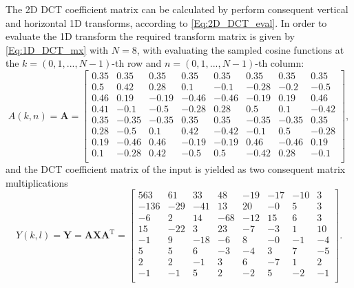 The 2D DCT coefficient matrix can be calculated by perform consequent vertical and horizontal 1D transforms, according to \eqref{Eq:2D_DCT_eval}.
In order to evaluate the 1D transform the required transform matrix is given by \eqref{Eq:1D_DCT_mx} with $N = 8$, with evaluating the sampled cosine functions at the $k = (0,1,...,N-1)$-th row and  $n = (0,1,...,N-1)$-th column:
\begin{equation}
A(k,n) = \mathbf{A} = \begin{bmatrix}
       0.35  &  0.35  &  0.35  &  0.35  &  0.35  &  0.35  &  0.35 & 0.35  \\[0.3em]
	0.5     & 0.42  & 0.28   &  0.1   & -0.1   & -0.28  & -0.2  &  -0.5 \\[0.3em]
    0.46 &  0.19  & -0.19 & -0.46 &  -0.46 & -0.19  &  0.19  &  0.46 \\[0.3em]
    0.41  & -0.1   & -0.5  & -0.28 &   0.28 &  0.5  &   0.1  & -0.42 \\[0.3em]
    0.35  & -0.35  & -0.35 &   0.35 &   0.35  & -0.35 &  -0.35  &  0.35 \\[0.3em]
    0.28  & -0.5 &  0.1 &   0.42 &  -0.42 & -0.1 &   0.5 & -0.28 \\[0.3em]
    0.19  & -0.46  &  0.46  & -0.19 &  -0.19  &  0.46  & -0.46  &  0.19 \\[0.3em]
    0.1 &  -0.28 &    0.42 &  -0.5 & 0.5 & -0.42 & 0.28 & -0.1 \\[0.3em]
       \end{bmatrix}, 
\end{equation}
and the DCT coefficient matrix of the input is yielded as two consequent matrix multiplications
\begin{equation}
Y(k,l) =  \mathbf{Y} = \mathbf{A} \mathbf{X} \mathbf{A}^{\mathrm{T}} =
\begin{bmatrix}
  563  & 61 &  33 &  48 & -19 & -17&  -10 &   3 \\[0.3em]
 -136 & -29 & -41 &  13&  20 & -0 &  5    &   3 \\[0.3em]
   -6 &   2 &  14 & -68 & -12 & 15 &   6  &   3 \\[0.3em]
   15 & -22 &  3  &  23 &  -7 &  -3 &   1 &   10 \\[0.3em]
   -1 &   9& -18  &  -6 &   8 &  -0 &  -1 &  -4 \\[0.3em]
    5 &   5&   6  &  -3 &  -4 &   3 &   7 &  -5 \\[0.3em]
    2 &   2&  -1   &   3 &   6 &  -7 &  1 &   2 \\[0.3em]
   -1&  -1&   5   &   2 &  -2 &   5 &  -2 &  -1 \\[0.3em]
       \end{bmatrix}.
\end{equation}

